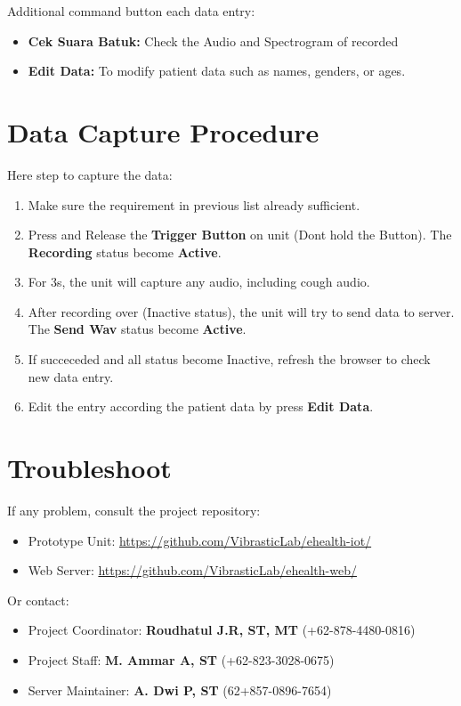 \documentclass[a4paper,12pt,oneside,pdflatex,italian,final,twocolumn]{article}
\begin{document}
	Additional command button each data entry:

	\begin{itemize}
		\item \textbf{Cek Suara Batuk:} Check the Audio and Spectrogram of recorded

		\item \textbf{Edit Data:} To modify patient data such as names, genders, or ages.
	\end{itemize}

	\newpage
	\raggedright
	\section{Data Capture Procedure}

	Here step to capture the data:
	\begin{enumerate}
		\item Make sure the requirement in previous list already sufficient.

		\item Press and Release the \textbf{Trigger Button} on unit (Dont hold the Button).
		The \textbf{Recording} status become \textbf{Active}.

		\item For 3s, the unit will capture any audio, including cough audio.

		\item After recording over (Inactive status), the unit will try to send data to server.
		The \textbf{Send Wav} status become \textbf{Active}.

		\item If succeceded and all status become Inactive, refresh the browser to check new data entry.

		\item Edit the entry according the patient data by press \textbf{Edit Data}.
	\end{enumerate}

	\raggedright
	\section{Troubleshoot}

	If any problem, consult the project repository:

	\begin{itemize}
		\item Prototype Unit: \url{https://github.com/VibrasticLab/ehealth-iot/}

		\item Web Server: \url{https://github.com/VibrasticLab/ehealth-web/}
	\end{itemize}

	Or contact:

	\begin{itemize}
		\item Project Coordinator: \textbf{Roudhatul J.R, ST, MT} (+62-878-4480-0816)

		\item Project Staff: \textbf{M. Ammar A, ST} (+62-823-3028-0675)

		\item Server Maintainer: \textbf{A. Dwi P, ST} (62+857-0896-7654)
	\end{itemize}
\end{document}

